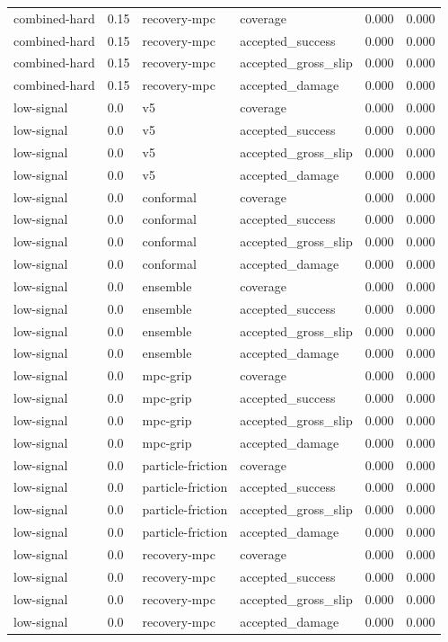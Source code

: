 \documentclass{article}
\begin{document}
\begin{longtable}{@{}ll llrr@{}}
combined-hard & 0.15 & recovery-mpc & coverage & 0.000 & 0.000 \\
combined-hard & 0.15 & recovery-mpc & accepted\_success & 0.000 & 0.000 \\
combined-hard & 0.15 & recovery-mpc & accepted\_gross\_slip & 0.000 & 0.000 \\
combined-hard & 0.15 & recovery-mpc & accepted\_damage & 0.000 & 0.000 \\
low-signal & 0.0 & v5 & coverage & 0.000 & 0.000 \\
low-signal & 0.0 & v5 & accepted\_success & 0.000 & 0.000 \\
low-signal & 0.0 & v5 & accepted\_gross\_slip & 0.000 & 0.000 \\
low-signal & 0.0 & v5 & accepted\_damage & 0.000 & 0.000 \\
low-signal & 0.0 & conformal & coverage & 0.000 & 0.000 \\
low-signal & 0.0 & conformal & accepted\_success & 0.000 & 0.000 \\
low-signal & 0.0 & conformal & accepted\_gross\_slip & 0.000 & 0.000 \\
low-signal & 0.0 & conformal & accepted\_damage & 0.000 & 0.000 \\
low-signal & 0.0 & ensemble & coverage & 0.000 & 0.000 \\
low-signal & 0.0 & ensemble & accepted\_success & 0.000 & 0.000 \\
low-signal & 0.0 & ensemble & accepted\_gross\_slip & 0.000 & 0.000 \\
low-signal & 0.0 & ensemble & accepted\_damage & 0.000 & 0.000 \\
low-signal & 0.0 & mpc-grip & coverage & 0.000 & 0.000 \\
low-signal & 0.0 & mpc-grip & accepted\_success & 0.000 & 0.000 \\
low-signal & 0.0 & mpc-grip & accepted\_gross\_slip & 0.000 & 0.000 \\
low-signal & 0.0 & mpc-grip & accepted\_damage & 0.000 & 0.000 \\
low-signal & 0.0 & particle-friction & coverage & 0.000 & 0.000 \\
low-signal & 0.0 & particle-friction & accepted\_success & 0.000 & 0.000 \\
low-signal & 0.0 & particle-friction & accepted\_gross\_slip & 0.000 & 0.000 \\
low-signal & 0.0 & particle-friction & accepted\_damage & 0.000 & 0.000 \\
low-signal & 0.0 & recovery-mpc & coverage & 0.000 & 0.000 \\
low-signal & 0.0 & recovery-mpc & accepted\_success & 0.000 & 0.000 \\
low-signal & 0.0 & recovery-mpc & accepted\_gross\_slip & 0.000 & 0.000 \\
low-signal & 0.0 & recovery-mpc & accepted\_damage & 0.000 & 0.000 \\
\bottomrule
\end{longtable}
\end{document}
